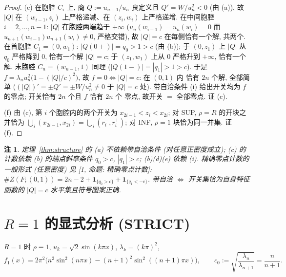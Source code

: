 \documentclass[UTF8]{ctexart}
\newtheorem{remark}[theorem]{注}
\begin{document}
\begin{proof}
(c) 在胞腔 $C_i$ 上, 商 $Q:=u_{n+1}/u_n$ 良定义且
$Q'=W/u_n^2<0$ (由 (a)), 故 $|Q|$ 在 $(w_{i-1},z_i)$ 上严格递减、在
$(z_i,w_i)$ 上严格递增. 在中间胞腔 $i=2,\dots,n-1$: $|Q|$ 在胞腔两端趋于
$+\infty$ ($u_n(w_{i-1})=u_n(w_i)=0$ 而 $u_{n+1}(w_{i-1})u_{n+1}(w_i)\neq0$,
严格交错), 故 $|Q|=c$ 在每侧恰有一个解, 共两个. 在首胞腔 $C_1=(0,w_1)$:
$|Q(0+)|=q_0>1>c$ (由 (b)); 于 $(0,z_1)$ 上 $|Q|$ 从 $q_0$ 严格降到 $0$,
恰有一个解 $|Q|=c$; 于 $(z_1,w_1)$ 上从 $0$ 严格升到 $+\infty$, 恰有一个解.
末胞腔 $C_n=(w_{n-1},1)$ 同理 ($|Q(1-)|=|q_1|>1>c$). 于是
$f=\lambda_nu_n^2\bigl(1-(|Q|/c)^2\bigr)$, 故 $f=0\iff|Q|=c$: 在 $(0,1)$ 内
恰有 $2n$ 个解, 全部简单 ($(|Q|)'=\pm Q'=\pm W/u_n^2\neq0$ 于 $|Q|=c$ 处).
带自洽条件 (i) 给出开关均为 $f$ 的零点; 开关恰有 $2n$ 个且 $f$ 恰有 $2n$ 个
零点, 故开关 $=$ 全部零点. 证 (c).

(f) 由 (c), 第 $i$ 个胞腔内的两个开关为 $x_{2i-1}<z_i<x_{2i}$; 对 SUP,
$\rho=R$ 的开块之并恰为 $\bigcup_i(x_{2i-1},x_{2i})=\bigcup_i(r_i^-,r_i^+)$; 对 INF,
$\rho=1$ 块恰为同一并集. 证 (f).
\end{proof}

\begin{remark}
定理~\ref{thm:structure} 的 (a) 不依赖带自洽条件 (对任意正密度成立);
(c) 的计数依赖 (b) 的端点斜率条件 $q_0>c$, $|q_1|>c$; (b)(d)(e) 依赖 (i).
精确零点计数的一般形式 (任意密度) 见 [1, 命题: 精确零点计数]:
$\#Z(F;(0,1))=2n-2+\mathbf1_{\{q_0>c\}}+\mathbf1_{\{q_1<-c\}}$.
带自洽 $\iff$ 开关集恰为自身特征函数的 $|Q|=c$ 水平集且符号图案正确.
\end{remark}

\section{\texorpdfstring{$R=1$}{R=1} 的显式分析 (STRICT)}\label{sec:r1}

$R=1$ 时 $\rho\equiv1$, $u_k=\sqrt2\sin(k\pi x)$, $\lambda_k=(k\pi)^2$,
\begin{equation}\label{eq:f1}
	f_1(x)=2\pi^2\bigl(n^2\sin^2(n\pi x)-(n+1)^2\sin^2((n+1)\pi x)\bigr),
	\qquad
	c_0:=\sqrt{\frac{\lambda_n}{\lambda_{n+1}}}=\frac{n}{n+1}.
\end{equation}
\end{document}

